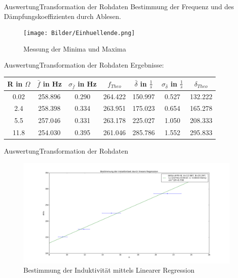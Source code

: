 \documentclass[11pt]{beamer}
\begin{document}
\begin{frame}{Auswertung}{Transformation der Rohdaten}
Bestimmung der Frequenz und des Dämpfungskoeffizienten durch Ablesen.
\begin{figure}[H]
\caption{Messung der Minima und Maxima}
\centering
\texttt{[image: Bilder/Einhuellende.png]}
\end{figure}
\end{frame}

\begin{frame}{Auswertung}{Transformation der Rohdaten}
Ergebnisse:
\begin{center}
\begin{tabular}{c|c|c|c|c|c|c}
R in $\Omega$ & $\bar{f}$ in Hz & $\sigma_{\bar{f}}$ in Hz & $f_{Theo}$&  $\bar{\delta}$ in $\frac{1}{s}$ & $\sigma_{\bar{\delta}}$ in $\frac{1}{s}$  & $\delta_{Theo}$ \\ 
\hline 
0.02 & 258.896 & 0.290 & 264.422 & 150.997 & 0.527 & 132.222 \\ 
\hline 
2.4 & 258.398 & 0.334 & 263.951 & 175.023 & 0.654  & 165.278\\ 
\hline 
5.5 & 257.046 & 0.331 & 263.178 & 225.027 & 1.050  & 208.333\\ 
\hline 
11.8 & 254.030 & 0.395 & 261.046 & 285.786 & 1.552  & 295.833 \\ 
\end{tabular} 
\end{center}
\end{frame}

\begin{frame}{Auswertung}{Transformation der Rohdaten}
\begin{figure}[H]
\caption{Bestimmung der Induktivität mittels Linearer Regression}
\centering
\includegraphics[scale=0.2]{Bilder/Induktivität_linreg.png}
\end{figure}
\end{frame}
\end{document}
